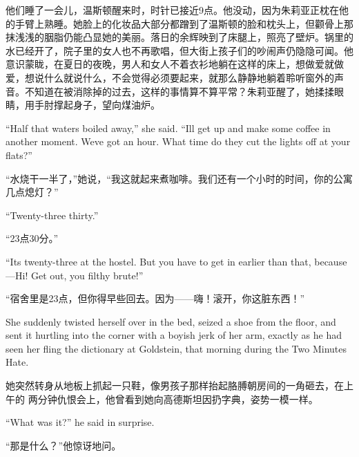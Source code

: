 \begin{paracol}{2}
\switchcolumn

他们睡了一会儿，温斯顿醒来时，时针已接近9点。他没动，因为朱莉亚正枕在他的手臂上熟睡。她脸上的化妆品大部分都蹭到了温斯顿的脸和枕头上，但颧骨上那抹浅浅的胭脂仍能凸显她的美丽。落日的余辉映到了床腿上，照亮了壁炉。锅里的水已经开了，院子里的女人也不再歌唱，但大街上孩子们的吵闹声仍隐隐可闻。他意识蒙眬，在夏日的夜晚，男人和女人不着衣衫地躺在这样的床上，想做爱就做爱，想说什么就说什么，不会觉得必须要起来，就那么静静地躺着聆听窗外的声音。不知道在被消除掉的过去，这样的事情算不算平常？朱莉亚醒了，她揉揉眼睛，用手肘撑起身子，望向煤油炉。

\switchcolumn*

``Half that water\textquotesingle s boiled away,'' she said.
``I\textquotesingle ll get up and make some coffee in another moment.
We\textquotesingle ve got an hour. What time do they cut the lights off
at your flats?''

\switchcolumn

``水烧干一半了，''她说，``我这就起来煮咖啡。我们还有一个小时的时间，你的公寓几点熄灯？''

\switchcolumn*

``Twenty-three thirty.''

\switchcolumn

``23点30分。''

\switchcolumn*

``It\textquotesingle s twenty-three at the hostel. But you have to get in
earlier than that, because---Hi! Get out, you filthy brute!''

\switchcolumn

``宿舍里是23点，但你得早些回去。因为——嗨！滚开，你这脏东西！''

\switchcolumn*

She suddenly twisted herself over in the bed, seized a shoe from the
floor, and sent it hurtling into the corner with a boyish jerk of her
arm, exactly as he had seen her fling the dictionary at Goldstein, that
morning during the Two Minutes Hate.

\switchcolumn

她突然转身从地板上抓起一只鞋，像男孩子那样抬起胳膊朝房间的一角砸去，在上午的
两分钟仇恨会上，他曾看到她向高德斯坦因扔字典，姿势一模一样。

\switchcolumn*

``What was it?'' he said in surprise.

\switchcolumn

``那是什么？''他惊讶地问。

\switchcolumn*


\end{paracol}
